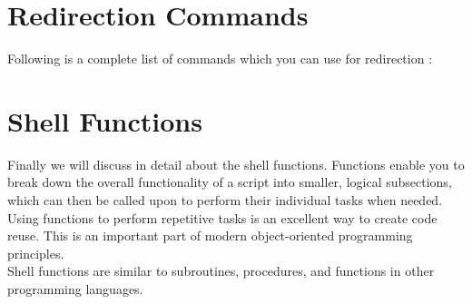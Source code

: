 \documentclass{article}
\begin{document}
\section*{Redirection Commands}
Following is a complete list of commands which you can use for redirection :
\begin{center}
\end{center}

\section*{Shell Functions}
Finally we will discuss in detail about the shell functions. Functions enable you to break down the overall functionality of a script into smaller, logical subsections, which can then be called upon to perform their individual tasks when needed.\\
Using functions to perform repetitive tasks is an excellent way to create code reuse. This is an important part of modern object-oriented programming principles.\\
Shell functions are similar to subroutines, procedures, and functions in other programming languages.\\
\end{document}
